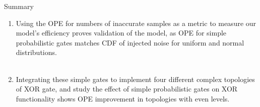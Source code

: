 \documentclass{beamer}
\begin{document}
\begin{frame}{Summary}
    \begin{enumerate}
        \item Using the OPE for numbers of inaccurate samples as a metric to measure our model’s efficiency proves validation of the model, as OPE for simple probabilistic gates matches CDF of injected noise for uniform and normal distributions.\\\\
        \item Integrating these simple gates to implement four different complex topologies of XOR gate, and study the effect of simple probabilistic gates on XOR functionality shows OPE improvement in topologies with even levels.\\\\
    \end{enumerate}
\end{frame}
\end{document}
